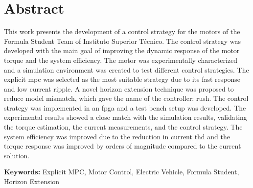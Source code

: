 
\section*{Abstract}


This work presents the development of a control strategy for the motors of the Formula Student Team of Instituto Superior Técnico. The control strategy was developed with the main goal of improving the dynamic response of the motor torque and the system efficiency. The motor was experimentally characterized and a simulation environment was created to test different control strategies. The explicit \gls{mpc} was selected as the most suitable strategy due to its fast response and low current ripple. A novel horizon extension technique was proposed to reduce model mismatch, which gave the name of the controller: \acrfull{rush}. The control strategy was implemented in an \gls{fpga} and a test bench setup was developed. The experimental results showed a close match with the simulation results, validating the torque estimation, the current measurements, and the control strategy. The system efficiency was improved due to the reduction in current \gls{thd} and the torque response was improved by orders of magnitude compared to the current solution.
\vfill

\textbf{\Large Keywords:} Explicit MPC, Motor Control, Electric Vehicle, Formula Student, Horizon Extension